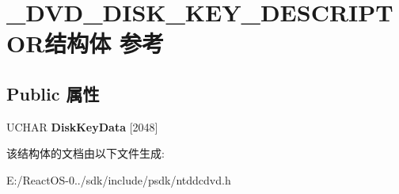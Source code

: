 \hypertarget{struct___d_v_d___d_i_s_k___k_e_y___d_e_s_c_r_i_p_t_o_r}{}\section{\+\_\+\+D\+V\+D\+\_\+\+D\+I\+S\+K\+\_\+\+K\+E\+Y\+\_\+\+D\+E\+S\+C\+R\+I\+P\+T\+O\+R结构体 参考}
\label{struct___d_v_d___d_i_s_k___k_e_y___d_e_s_c_r_i_p_t_o_r}
\subsection*{Public 属性}
\begin{DoxyCompactItemize}
\item 
\mbox{\label{struct___d_v_d___d_i_s_k___k_e_y___d_e_s_c_r_i_p_t_o_r_a840d16b2bf522381128dca107bcf5095}} 
U\+C\+H\+AR {\bfseries Disk\+Key\+Data} \mbox{[}2048\mbox{]}
\end{DoxyCompactItemize}


该结构体的文档由以下文件生成\+:\begin{DoxyCompactItemize}
\item 
E\+:/\+React\+O\+S-\/0../sdk/include/psdk/ntddcdvd.\+h\end{DoxyCompactItemize}
